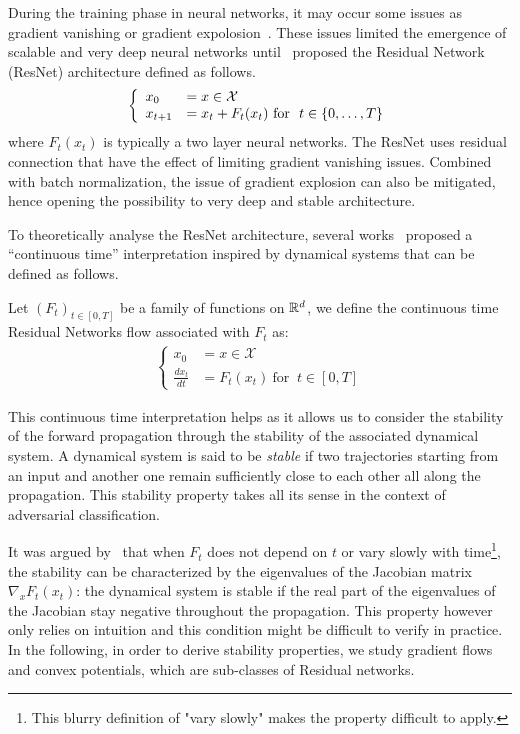During the training phase in neural networks, it may occur some issues as gradient vanishing or gradient expolosion~\citep{hochreiter2001gradient}. These issues limited the emergence of scalable and very deep neural networks until~\cite{he2016deep} proposed the Residual Network (ResNet) architecture defined as follows.
\begin{align*}
  \left\{
    \begin{array}{ll}
    x_0 &= x\in\XX\\
    x_{t+1} &= x_t+F_{{t}}(x_{t}) \  \text{for } \ t\in\{0, \dots,T\}
  \end{array}
  \right.
\end{align*}
where $F_{{t}}(x_{t})$ is typically a two layer neural networks. The ResNet uses residual connection that have the effect of limiting gradient vanishing issues. Combined with batch normalization, the issue of gradient explosion can also be mitigated, hence opening the possibility to very deep and stable architecture. 

To theoretically analyse the ResNet architecture, several works~\citep{haber2017stable,e17Proposal,lu18beyond,chen2018neural} proposed a ``continuous time'' interpretation inspired by dynamical systems that can be defined as follows.

\begin{definition}\label{def:flow}
Let $(F_{t})_{t\in[0,T]}$ be a family of functions on $\mathbb{R}^d$, we define the continuous time Residual Networks flow associated with $F_t$ as:
\begin{align*}
  \left\{
    \begin{array}{ll}
    x_0 &= x\in\mathcal{X}\\
    \frac{dx_{t}}{dt} &= F_{{t}}(x_{t}) \  \text{for } \ t\in[0, T]
  \end{array}
  \right.
\end{align*}
\end{definition}

This continuous time interpretation helps as it allows us to consider the stability of the forward propagation through the stability of the associated dynamical system.
A dynamical system is said to be \emph{stable} if two trajectories starting from an input and another one remain sufficiently close to each other all along the propagation. This stability property takes all its sense in the context of adversarial classification.

It was argued by~\citet{haber2017stable} that when $F_{t}$ does not depend on $t$ or vary slowly with time\footnote{This blurry definition of "vary slowly" makes the property difficult to apply.}, the stability can be characterized by the eigenvalues of the Jacobian matrix $\nabla_x F_{t}(x_t)$: 
the dynamical system is stable if the real part of the eigenvalues of the Jacobian stay negative throughout the propagation.
This property however only relies on intuition and this condition might be difficult to  verify in practice.
In the following, in order to derive stability properties, we study gradient flows and convex potentials, which are sub-classes of Residual networks.

